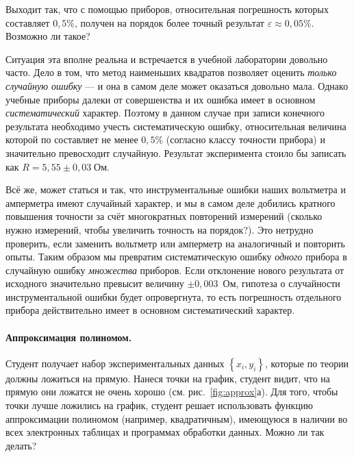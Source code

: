 Выходит так, что с помощью приборов, относительная погрешность которых
составляет $0{,}5\%$, получен на порядок более точный результат
$\varepsilon\approx0{,}05\%$.
Возможно ли такое?

\enlargethispage{1em}

\begin{longnote}
Ситуация эта вполне реальна и встречается в учебной лаборатории довольно часто.
Дело в
том, что метод наименьших квадратов позволяет оценить \emph{только
случайную ошибку} --- и она в самом деле может оказаться довольно мала. Однако
учебные приборы далеки от совершенства и их ошибка имеет в основном
\emph{систематический} характер. Поэтому в данном случае при записи конечного
результата
необходимо учесть систематическую ошибку, относительная величина которой по
составляет
не менее $0{,}5$\% (согласно классу точности прибора) и значительно превосходит
случайную. Результат эксперимента стоило бы записать как
$R=5{,}55\pm0{,}03\;\text{Ом}$.

Всё же, может статься и так, что инструментальные
ошибки наших вольтметра и амперметра имеют случайный характер, и мы
в самом деле добились кратного повышения точности за счёт многократных
повторений измерений (сколько нужно измерений, чтобы увеличить точность
на порядок?). Это нетрудно проверить, если заменить вольтметр или
амперметр на аналогичный и повторить опыты. Таким образом мы превратим
систематическую ошибку \emph{одного} прибора в случайную ошибку
\emph{множества}
приборов. Если отклонение нового результата от исходного значительно
превысит величину $\pm0{,}003$~Ом, гипотеза о случайности инструментальной
ошибки будет опровергнута, то есть погрешность отдельного прибора
действительно имеет в основном систематический характер.\par
\end{longnote}

\paragraph{Аппроксимация полиномом.}
Студент получает набор экспериментальных данных $\left\{ x_{i},y_{i}\right\} $,
которые по теории должны ложиться на прямую. Нанеся точки на график,
студент видит, что на прямую они ложатся не очень хорошо (см.
рис.~\ref{fig:approx}а).
Для того, чтобы точки лучше ложились на график, студент решает использовать
функцию аппроксимации полиномом (например, квадратичным), имеющуюся
в наличии во всех электронных таблицах и программах обработки данных.
Можно ли так делать?

